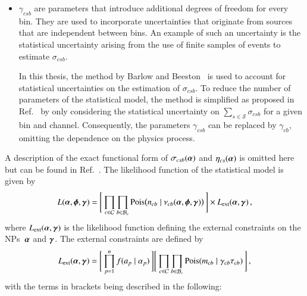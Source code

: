 \begin{itemize}
\item $\gamma_{csb}$ are parameters that introduce additional degrees of freedom
  for every bin. They are used to incorporate uncertainties that originate from
  sources that are independent between bins. An example of such an uncertainty
  is the statistical uncertainty arising from the use of finite samples of
  events to estimate $\sigma_{csb}$.

  In this thesis, the method by Barlow and Beeston~\cite{barlow1993} is used to
  account for statistical uncertainties on the estimation of $\sigma_{csb}$. To
  reduce the number of parameters of the statistical model, the method is
  simplified as proposed in Ref.~\cite{conway2011} by only considering the
  statistical uncertainty on $\sum_{s \in \mathcal{S}} \sigma_{csb}$ for a given
  bin and channel. Consequently, the parameters $\gamma_{csb}$ can be replaced
  by $\gamma_{cb}$, omitting the dependence on the physics process.

\end{itemize}
A description of the exact functional form of $\sigma_{csb}(\myvec{\alpha})$ and
$\eta_{cs}(\myvec{\alpha})$ is omitted here but can be found in
Ref.~\cite{cranmer2012}. The likelihood function of the statistical model is
given by
\begin{align}
  L(\myvec{\alpha}, \myvec{\phi}, \myvec{\gamma}) = \Biggl[\,
  \prod_{c \in \mathcal{C}}
  \prod_{b \in \mathcal{B}_{c}}
  \pois\bigl( n_{cb} \mid \nu_{cb}(\myvec{\alpha}, \myvec{\phi}, \myvec{\gamma}) \bigr)
  \,\Biggr]
  \times L_{\text{ext}}(\myvec{\alpha}, \myvec{\gamma}) \,\text{,}
  \label{eq:likelihood_histfactory}
\end{align}
where $L_{\text{ext}}(\myvec{\alpha}, \myvec{\gamma})$ is the likelihood
function defining the external constraints on the NPs~$\myvec{\alpha}$ and
$\myvec{\gamma}$. The external constraints are defined by
\begin{align*}
  L_{\text{ext}}(\myvec{\alpha}, \myvec{\gamma}) =
  \Biggl[\, \prod_{p=1}^{n} f(a_p \mid \alpha_p)     \,\Biggr]
  \Biggl[\, \prod_{c \in \mathcal{C}} \prod_{b \in \mathcal{B}_{c}} \pois(m_{cb} \mid \gamma_{cb} \tau_{cb}) \,\Biggr] \,\text{,}
\end{align*}
with the terms in brackets being described in the following:

